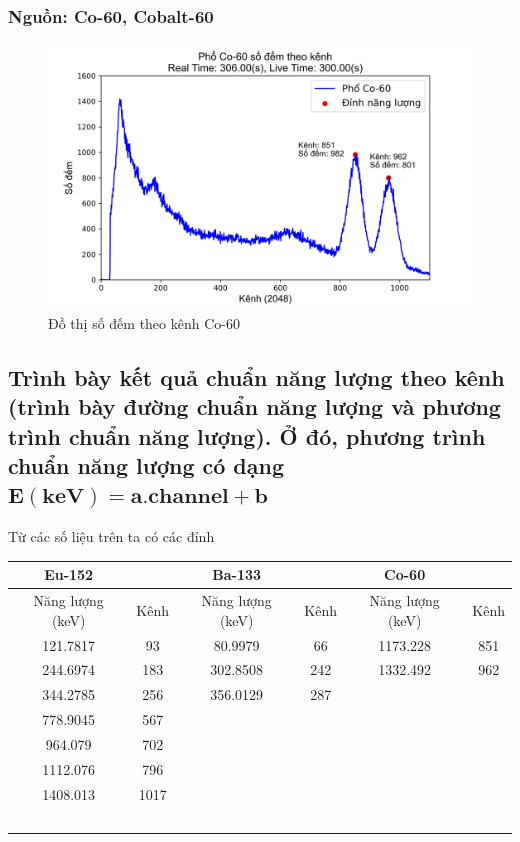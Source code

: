 \documentclass[12pt]{article}
\begin{document}
\subsubsection{Nguồn: Co-60, Cobalt-60}

\begin{figure}[!th]
	\includegraphics[width=\textwidth]{Co-60-Plot_cn}
	\caption{Đồ thị số đếm theo kênh Co-60}
\end{figure}

\newpage
\subsection{ Trình bày kết quả chuẩn năng lượng theo kênh (trình bày đường chuẩn năng lượng và phương trình chuẩn năng lượng). Ở đó, phương trình chuẩn năng lượng có dạng $\mathbf{E(keV) = a.channel + b}$}

Từ các số liệu trên ta có các đỉnh

\begin{table}[!ht]
    \centering
    \begin{tabular}{cccccc}
    \hline
        \textbf{Eu-152} & \textbf{} & \textbf{Ba-133} & \textbf{} & \textbf{Co-60} & \textbf{} \\ \hline
        Năng lượng (keV) & Kênh & Năng lượng (keV) & Kênh & Năng lượng (keV) & Kênh \\ 
        121.7817 & 93 & 80.9979 & 66 & 1173.228 & 851 \\ 
        244.6974 & 183 & 302.8508 & 242 & 1332.492 & 962 \\ 
        344.2785 & 256 & 356.0129 & 287 & ~ & ~ \\ 
        778.9045 & 567 & ~ & ~ & ~ & ~ \\ 
        964.079 & 702 & ~ & ~ & ~ & ~ \\ 
        1112.076 & 796 & ~ & ~ & ~ & ~ \\ 
        1408.013 & 1017 & ~ & ~ & ~ & ~ \\ 
        ~ & ~ & ~ & ~ & ~ & ~ \\ \hline
    \end{tabular}
\end{table}
\end{document}
